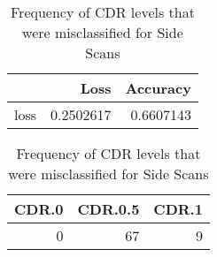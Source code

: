 \begin{table}[h] \centering
\begin{minipage}{0.3\textwidth}

\begin{tabular}{lrr}
\toprule
  & Loss & Accuracy\\
\midrule
loss & 0.2502617 & 0.6607143\\
\bottomrule
\end{tabular}
\caption{Error and Accuracy for Convolution on Side Scans}
\end{minipage}
\hspace{3cm}
\begin{minipage}{0.3\textwidth}

\begin{tabular}{rrr}
\toprule
CDR.0 & CDR.0.5 & CDR.1\\
\midrule
0 & 67 & 9\\
\bottomrule
\end{tabular}
\caption{Frequency of CDR levels that were misclassified for Side Scans}
\end{minipage}
\end{table}

